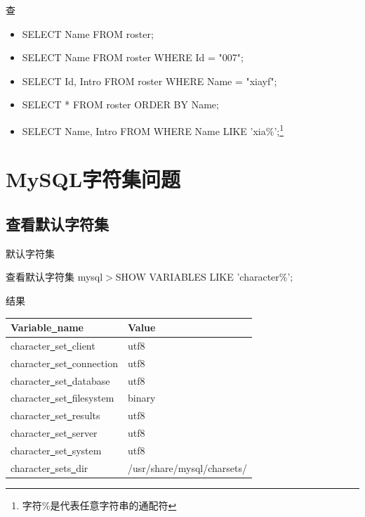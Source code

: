 \documentclass[CJK]{beamer}
\begin{document}
\begin{CJK*}{UTF8}{gbsn}
\begin{frame}{查}
	\begin{itemize}
		\item SELECT Name FROM roster;
		\item SELECT Name FROM roster WHERE Id = "007";
		\item SELECT Id, Intro FROM roster WHERE Name = "xiayf";
		\item SELECT * FROM roster ORDER BY Name;
		\item SELECT Name, Intro FROM WHERE Name LIKE 'xia\%';\footnote{字符\%是代表任意字符串的通配符} 
	\end{itemize}
\end{frame}
\section{MySQL字符集问题}
\subsection{查看默认字符集}
\begin{frame}{默认字符集}
	\begin{block}{查看默认字符集}
	mysql$>$SHOW VARIABLES LIKE 'character\%';
	\end{block}
	\begin{block}{结果}
	\begin{tabular}{l|p{5cm}}\hline
	Variable\underline{\ }name & Value\\ \hline
	character\underline{\ }set\underline{\ }client & utf8\\
	character\underline{\ }set\underline{\ }connection & utf8\\
	character\underline{\ }set\underline{\ }database & utf8\\
	character\underline{\ }set\underline{\ }filesystem & binary\\
	character\underline{\ }set\underline{\ }results & utf8\\
	character\underline{\ }set\underline{\ }server & utf8\\
	character\underline{\ }set\underline{\ }system & utf8\\
	character\underline{\ }sets\underline{\ }dir & /usr/share/mysql/charsets/\\ \hline
	\end{tabular}
	\end{block}
\end{frame}

\end{CJK*}
\end{document}
